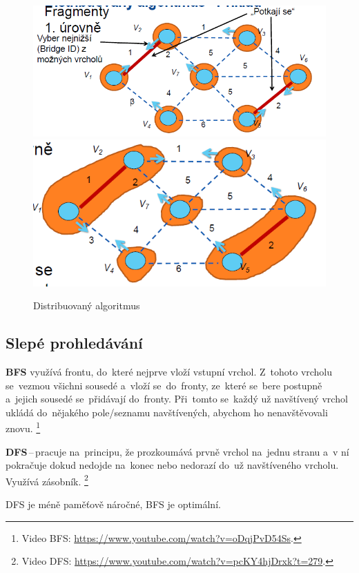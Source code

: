 \begin{figure}[ht]
	\centering
	\includegraphics[scale=0.5]{images/distributed1.PNG}
	\includegraphics[scale=0.5]{images/distributed2.PNG}
	\caption{Distribuovaný algoritmus}
	\label{distributed}
\end{figure}

\subsection{Slepé prohledávání}

\textbf{BFS} využívá frontu, do~které nejprve vloží vstupní vrchol. Z~tohoto vrcholu se~vezmou všichni sousedé a~vloží se~do~fronty, ze~které se~bere postupně a~jejich sousedé se~přidávají do~fronty. Při~tomto se~každý už navštívený vrchol ukládá do~nějakého pole/seznamu navštívených, abychom ho nenavštěvovali znovu.%
\footnote{Video BFS: \url{https://www.youtube.com/watch?v=oDqjPvD54Ss}.}

\textbf{DFS}\,--\,pracuje na~principu, že prozkoumává prvně vrchol na~jednu stranu a~v ní pokračuje dokud nedojde na~konec nebo nedorazí do~už navštíveného vrcholu. Využívá zásobník.%
\footnote{Video DFS: \url{https://www.youtube.com/watch?v=pcKY4hjDrxk?t=279}.}

DFS je méně paměťově náročné, BFS je optimální.

